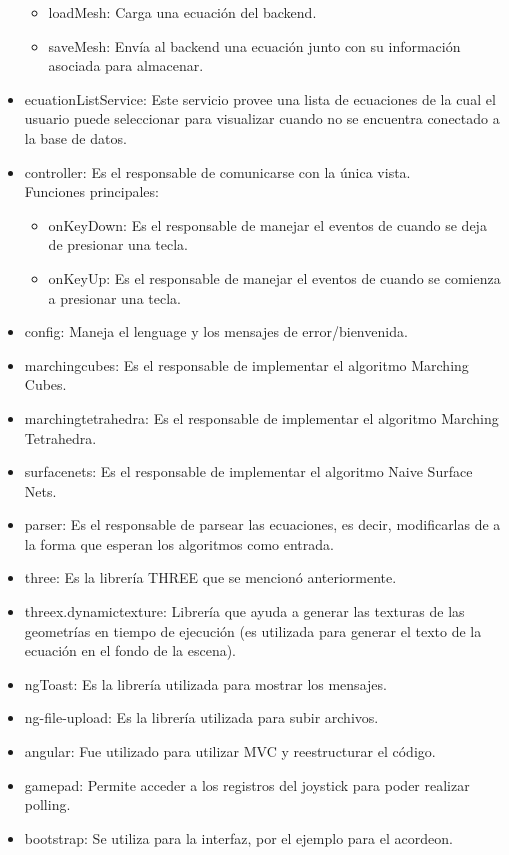 \documentclass[12pt]{article}
\begin{document}
\begin{itemize}
\begin{itemize}
	\item loadMesh: Carga una ecuación del backend.
	\item saveMesh: Envía al backend una ecuación junto con su información asociada para almacenar.
	\end{itemize}
\item ecuationListService: Este servicio provee una lista de ecuaciones de la cual el usuario puede seleccionar para visualizar cuando no se encuentra conectado a la base de datos.
\item controller: Es el responsable de comunicarse con la única vista.
	\\Funciones principales:
	\begin{itemize}
	\item onKeyDown: Es el responsable de manejar el eventos de cuando se deja de presionar una tecla.
	\item onKeyUp: Es el responsable de manejar el eventos de cuando se comienza a presionar una tecla.
	\end{itemize}
\item config: Maneja el lenguage y los mensajes de error/bienvenida.
\item marchingcubes: Es el responsable de implementar el algoritmo Marching Cubes.
\item marchingtetrahedra: Es el responsable de implementar el algoritmo Marching Tetrahedra.
\item surfacenets: Es el responsable de implementar el algoritmo Naive Surface Nets.
\item parser: Es el responsable de parsear las ecuaciones, es decir, modificarlas de a la forma que esperan los algoritmos como entrada.
\item three: Es la librería THREE que se mencionó anteriormente.
\item threex.dynamictexture: Librería que ayuda a generar las texturas de las geometrías en tiempo de ejecución (es utilizada para generar el texto de la ecuación en el fondo de la escena).
\item ngToast: Es la librería utilizada para mostrar los mensajes.
\item ng-file-upload: Es la librería utilizada para subir archivos.
\item angular: Fue utilizado para utilizar MVC y reestructurar el código.
\item gamepad: Permite acceder a los registros del joystick para poder realizar polling.
\item bootstrap: Se utiliza para la interfaz, por el ejemplo para el acordeon.

\end{itemize}
\end{document}
